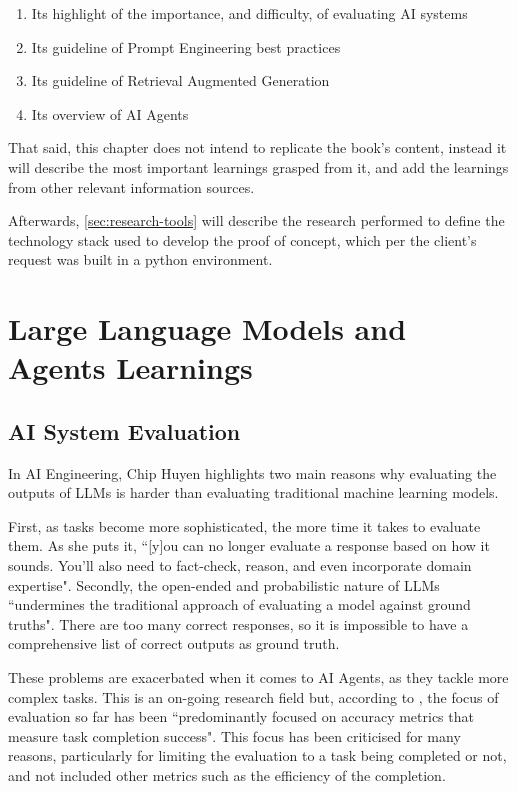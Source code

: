 \documentclass[a4paper]{report}
\begin{document}
\begin{enumerate}
    \item Its highlight of the importance, and difficulty, of evaluating AI systems
    \item Its guideline of Prompt Engineering best practices
    \item Its guideline of Retrieval Augmented Generation
    \item Its overview of AI Agents
\end{enumerate}

That said, this chapter does not intend to replicate the book's content, instead it will describe the most important learnings grasped from it, and add the learnings from other relevant information sources.

Afterwards, \autoref{sec:research-tools} will describe the research performed to define the technology stack used to develop the proof of concept, which per the client's request was built in a python environment.

\section{Large Language Models and Agents Learnings}
\label{sec:research-llms}

\subsection{AI System Evaluation}

In AI Engineering, Chip Huyen highlights two main reasons why evaluating the outputs of LLMs is harder than evaluating traditional machine learning models.

First, as tasks become more sophisticated, the more time it takes to evaluate them. As she puts it, ``[y]ou can  no longer evaluate a response based on how it sounds. You'll also need to fact-check, reason, and even incorporate domain expertise".  Secondly, the open-ended and probabilistic nature of LLMs ``undermines the traditional approach of evaluating a model against ground truths". There are too many correct responses, so it is impossible to have a comprehensive list of correct outputs as ground truth.

These problems are exacerbated when it comes to AI Agents, as they tackle more complex tasks. This is an on-going research field but, according to \cite{krishnan2025aiagentsevolutionarchitecture}, the focus of evaluation so far has been ``predominantly focused on accuracy metrics that measure task completion success". This focus has been criticised for many reasons, particularly for limiting the evaluation to a task being completed or not, and not included other metrics such as the efficiency of the completion.
\end{document}
